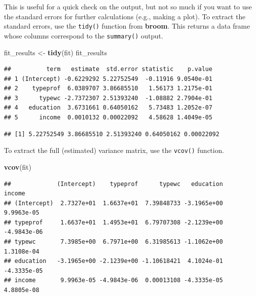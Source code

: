 \documentclass[12pt,oneside,openany]{book}
\newenvironment{Shaded}{\begin{snugshade}}{\end{snugshade}}
\newcommand{\KeywordTok}[1]{\textcolor[rgb]{0.13,0.29,0.53}{\textbf{{#1}}}}
\newcommand{\StringTok}[1]{\textcolor[rgb]{0.31,0.60,0.02}{{#1}}}
\newcommand{\NormalTok}[1]{{#1}}
\begin{document}
This is useful for a quick check on the output, but not so much if you
want to use the standard errors for further calculations (e.g., making a
plot). To extract the standard errors, use the \texttt{tidy()} function
from \textbf{broom}. This returns a data frame whose columns correspond
to the \texttt{summary()} output.

\begin{Shaded}
\begin{Highlighting}[]
\NormalTok{fit_results <-}\StringTok{ }\KeywordTok{tidy}\NormalTok{(fit)}
\NormalTok{fit_results}
\end{Highlighting}
\end{Shaded}

\begin{verbatim}
##          term   estimate  std.error statistic    p.value
## 1 (Intercept) -0.6229292 5.22752549  -0.11916 9.0540e-01
## 2    typeprof  6.0389707 3.86685510   1.56173 1.2175e-01
## 3      typewc -2.7372307 2.51393240  -1.08882 2.7904e-01
## 4   education  3.6731661 0.64050162   5.73483 1.2052e-07
## 5      income  0.0010132 0.00022092   4.58628 1.4049e-05
\end{verbatim}

\begin{Shaded}
\end{Shaded}

\begin{verbatim}
## [1] 5.22752549 3.86685510 2.51393240 0.64050162 0.00022092
\end{verbatim}

To extract the full (estimated) variance matrix, use the \texttt{vcov()}
function.

\begin{Shaded}
\begin{Highlighting}[]
\KeywordTok{vcov}\NormalTok{(fit)}
\end{Highlighting}
\end{Shaded}

\begin{verbatim}
##             (Intercept)    typeprof      typewc   education      income
## (Intercept)  2.7327e+01  1.6637e+01  7.39848733 -3.1965e+00  9.9963e-05
## typeprof     1.6637e+01  1.4953e+01  6.79707308 -2.1239e+00 -4.9843e-06
## typewc       7.3985e+00  6.7971e+00  6.31985613 -1.1062e+00  1.3108e-04
## education   -3.1965e+00 -2.1239e+00 -1.10618421  4.1024e-01 -4.3335e-05
## income       9.9963e-05 -4.9843e-06  0.00013108 -4.3335e-05  4.8805e-08
\end{verbatim}
\end{document}
